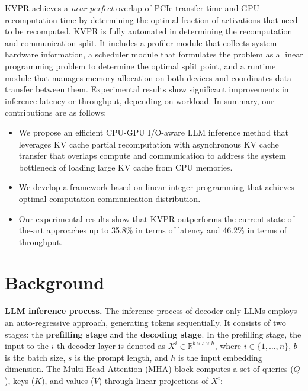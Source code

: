 \documentclass[11pt]{article}
\newcommand{\paperName}{KVPR}
\begin{document}
{\paperName} achieves a \textit{near-perfect} overlap of PCIe transfer time and GPU recomputation time by determining the optimal fraction of activations that need to be recomputed. {\paperName} is fully automated in determining the recomputation and communication split. It includes a profiler module that collects system hardware information, a scheduler module that formulates the problem as a linear programming problem to determine the optimal split point, and a runtime module that manages memory allocation on both devices and coordinates data transfer between them. Experimental results show significant improvements in inference latency or throughput, depending on workload. In summary, our contributions are as follows:

\begin{itemize}[topsep=0pt, partopsep=0pt, parsep=0pt, itemsep=2pt]
    \item We propose an efficient CPU-GPU I/O-aware LLM inference method that leverages KV cache partial recomputation with asynchronous KV cache transfer that overlaps compute and communication to address the system bottleneck of loading large KV cache from CPU memories.
    \item We develop a framework based on linear integer programming that achieves optimal computation-communication distribution.
    \item Our experimental results show that {\paperName} outperforms the current state-of-the-art approaches up to 35.8\% in terms of latency and 46.2\% in terms of throughput.
\end{itemize}



\section{Background}

\textbf{LLM inference process.}
The inference process of decoder-only LLMs employs an auto-regressive approach, generating tokens sequentially. It consists of two stages: the \textbf{prefilling stage} and the \textbf{decoding stage}. 
In the prefilling stage, the input to the $ i $-th decoder layer is denoted as $ X^i \in \mathbb{R}^{b \times s \times h} $, where $i \in \{1,\ldots,n\} $, $ b $ is the batch size, $ s $ is the prompt length, and $ h $ is the input embedding dimension. The Multi-Head Attention (MHA) block computes a set of queries ($ Q $), keys ($ K $), and values ($ V $) through linear projections of $ X^i $:
\end{document}
